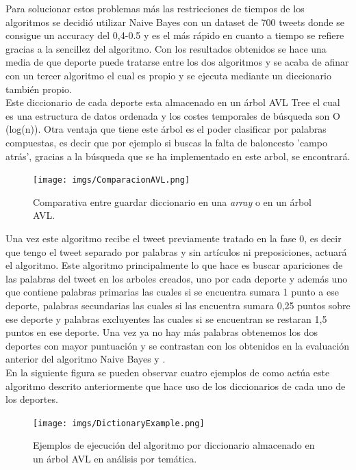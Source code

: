 \documentclass[../all.tex]{subfiles}
\begin{document}
	Para solucionar estos problemas más las restricciones de tiempos de los algoritmos se decidió utilizar Naive Bayes con un dataset de 700 tweets donde se consigue un accuracy del 0,4-0.5 y es el más rápido en cuanto a tiempo se refiere gracias a la sencillez del algoritmo. Con los resultados obtenidos se hace una media de que deporte puede tratarse entre los dos algoritmos y se acaba de afinar con un tercer algoritmo el cual es propio y se ejecuta mediante un diccionario también propio. \\
	\newpage
	Este diccionario de cada deporte esta almacenado en un árbol AVL Tree el cual es una estructura de datos ordenada y los costes temporales de búsqueda son O (log(n)). Otra ventaja que tiene este árbol es el poder clasificar por palabras compuestas, es decir que por ejemplo si buscas la falta de baloncesto 'campo atrás', gracias a la búsqueda que se ha implementado en este arbol, se encontrará.\\
	
	\begin{figure}[H]
		\centering
		\texttt{[image: imgs/ComparacionAVL.png]}
		\caption{Comparativa entre guardar diccionario en una \textit{array} o en un árbol AVL.}
	\end{figure}
	
	Una vez este algoritmo recibe el tweet previamente tratado en la fase 0, es decir que tengo el tweet separado por palabras y sin artículos ni preposiciones, actuará el algoritmo. Este algoritmo principalmente lo que hace es buscar apariciones de las palabras del tweet en los arboles creados, uno por cada deporte y además uno que contiene palabras primarias las cuales si se encuentra sumara 1 punto a ese deporte, palabras secundarias las cuales si las encuentra sumara 0,25 puntos sobre ese deporte y palabras excluyentes las cuales si se encuentran se restaran 1,5 puntos en ese deporte. Una vez ya no hay más palabras obtenemos los dos deportes con mayor puntuación y se contrastan con los obtenidos en la evaluación anterior del algoritmo Naive Bayes y .\\
	
	\newpage
	En la siguiente figura se pueden observar cuatro ejemplos de como actúa este algoritmo descrito anteriormente que hace uso de los diccionarios de cada uno de los deportes.
	
	\begin{figure}[H]
		\centering
		\texttt{[image: imgs/DictionaryExample.png]}
		\caption{Ejemplos de ejecución del algoritmo por diccionario almacenado en un árbol AVL en análisis por temática.}
	\end{figure}
\end{document}
